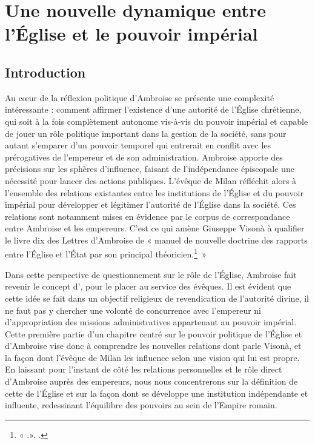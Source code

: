\section{Une nouvelle dynamique entre l'Église et le pouvoir impérial}

\subsection*{Introduction}

Au cœur de la réflexion politique d’Ambroise se présente une complexité intéressante : comment affirmer l'existence d’une autorité de l’Église chrétienne, qui soit à la fois complètement autonome vis-à-vis du pouvoir impérial et capable de jouer un rôle politique important dans la gestion de la société, sans pour autant s'emparer d’un pouvoir temporel qui entrerait en conflit avec les prérogatives de l’empereur et de son administration. Ambroise apporte des précisions sur les sphères d’influence, faisant de l’indépendance épiscopale une nécessité pour lancer des actions publiques. L’évêque de Milan réfléchit alors à l’ensemble des relations existantes entre les institutions de l’Église et du pouvoir impérial pour développer et légitimer l’autorité de l’Église dans la société. Ces relations sont notamment mises en évidence par le corpus de correspondance entre Ambroise et les empereurs. C’est ce qui amène Giuseppe Visonà à qualifier le livre dix des Lettres d'Ambroise de « manuel de nouvelle doctrine des rapports entre l’Église et l’État par son principal théoricien.\footnote{« .». \cite[33]{pizzolato_nec_timeo}.}~»

\bigskip

Dans cette perspective de questionnement sur le rôle de l’Église, Ambroise fait revenir le concept d’, pour le placer au service des évêques. Il est évident que cette idée se fait dans un objectif religieux de revendication de l’autorité divine, il ne faut pas y chercher une volonté de concurrence avec l’empereur ni d’appropriation des missions administratives appartenant au pouvoir impérial. Cette première partie d’un chapitre centré sur le pouvoir politique de l’Église et d’Ambroise vise donc à comprendre les nouvelles relations dont parle Visonà, et la façon dont l’évêque de Milan les influence selon une vision qui lui est propre. En laissant pour l’instant de côté les relations personnelles et le rôle direct d’Ambroise auprès des empereurs, nous nous concentrerons sur la définition de cette  de l’Église et sur la façon dont se développe une institution indépendante et influente, redessinant l’équilibre des pouvoirs au sein de l’Empire romain.

